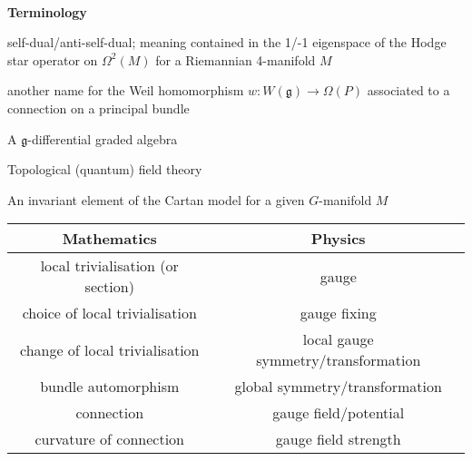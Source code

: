 \

\noindent\textbf{Terminology}


\newcommand{\term}[2]{\item[{\ \parbox{4.58cm}{#1}}]{#2}}
\begin{list}{}{ \setlength{\leftmargin}{4.8cm}
                \setlength{\labelwidth}{4.8cm}}

\term{SD/ASD}{self-dual/anti-self-dual; meaning contained in the 1/-1 eigenspace
of the Hodge star operator on $\Omega^2(M)$ for a Riemannian 4-manifold $M$}


\term{characteristic\\ homomorphism}{another name for the Weil homomorphism
$w:W(\mathfrak{g})\to \Omega(P)$ associated to a connection on a principal
bundle}

\term{$\mathfrak{g}$-dga}{A $\mathfrak{g}$-differential graded algebra}

\term{TQFT/TFT}{Topological (quantum) field theory}

\term{equivariant form}{An invariant element of the Cartan model for a given
$G$-manifold  $M$}


\end{list}
\begin{table}[hb]
	\centering
	\begin{tabular}{c | c }
		Mathematics & Physics \\
		\hline
		local trivialisation (or section) & gauge \\
		choice of local trivialisation & gauge fixing \\
		change of local trivialisation & local gauge symmetry/transformation\\
		bundle automorphism & global symmetry/transformation\\
		connection & gauge field/potential \\
		curvature of connection & gauge field strength \\
    \end{tabular}
	\label{tab:phys_terminology}
\end{table}


